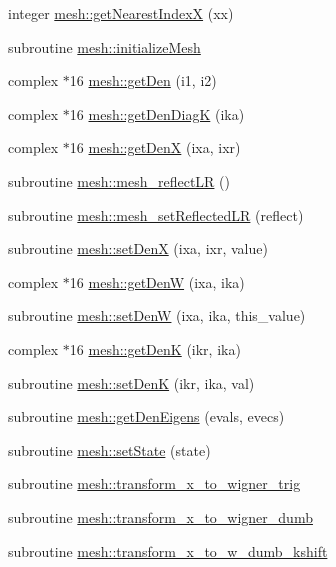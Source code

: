 \begin{DoxyCompactItemize}
\item 
integer \hyperlink{namespacemesh_ad1beeceb5580c23eb4fd6530573c395c}{mesh::getNearestIndexX} (xx)
\item 
subroutine \hyperlink{namespacemesh_a742012f09e48891eb9dd2a85601674a8}{mesh::initializeMesh}
\item 
complex $\ast$16 \hyperlink{namespacemesh_a30c07812e0215d470457c9be91bb6b65}{mesh::getDen} (i1, i2)
\item 
complex $\ast$16 \hyperlink{namespacemesh_af6c300cbff24f4eb25b428d822208430}{mesh::getDenDiagK} (ika)
\item 
complex $\ast$16 \hyperlink{namespacemesh_a87ae177a6a4383943393f8efa7da0018}{mesh::getDenX} (ixa, ixr)
\item 
subroutine \hyperlink{namespacemesh_abf02ca88d15c266099562e937ee507e4}{mesh::mesh\_\-reflectLR} ()
\item 
subroutine \hyperlink{namespacemesh_ac5a0f33502939ba9fae215e203d895f0}{mesh::mesh\_\-setReflectedLR} (reflect)
\item 
subroutine \hyperlink{namespacemesh_a7f55b8b4c3e045f04553b292c323b43a}{mesh::setDenX} (ixa, ixr, value)
\item 
complex $\ast$16 \hyperlink{namespacemesh_a54f9135de9933edd2a34168c4e5ebfca}{mesh::getDenW} (ixa, ika)
\item 
subroutine \hyperlink{namespacemesh_a7e79531a47425f91c6ac0921fc2203ed}{mesh::setDenW} (ixa, ika, this\_\-value)
\item 
complex $\ast$16 \hyperlink{namespacemesh_ab4cd19eafd4df4568c11c147b12f952d}{mesh::getDenK} (ikr, ika)
\item 
subroutine \hyperlink{namespacemesh_a16330a30f3f56c2944ef63240c049ee7}{mesh::setDenK} (ikr, ika, val)
\item 
subroutine \hyperlink{namespacemesh_ab3a026a1c77fc428f9a77f0ee37b0616}{mesh::getDenEigens} (evals, evecs)
\item 
subroutine \hyperlink{namespacemesh_aef51df23ee69f610420b25672a2da3ef}{mesh::setState} (state)
\item 
subroutine \hyperlink{namespacemesh_a0469cb1ff672271ea58fa1cca5daec7a}{mesh::transform\_\-x\_\-to\_\-wigner\_\-trig}
\item 
subroutine \hyperlink{namespacemesh_ab0c4d2eefb660f80c8bd5a26cfea90bb}{mesh::transform\_\-x\_\-to\_\-wigner\_\-dumb}
\item 
subroutine \hyperlink{namespacemesh_aedb02cc0a4ac5c08aef3398b9bca30be}{mesh::transform\_\-x\_\-to\_\-w\_\-dumb\_\-kshift}

\end{DoxyCompactItemize}
